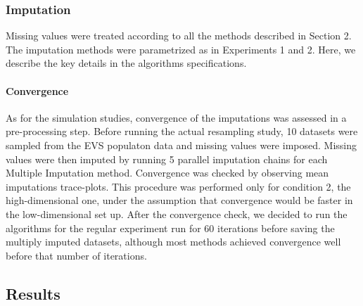 \subsubsection{Imputation}
	
	Missing values were treated according to all the methods described in Section 2.
	The imputation methods were parametrized as in Experiments 1 and 2.
	Here, we describe the key details in the algorithms specifications.

	\paragraph{Convergence}

	As for the simulation studies, convergence of the imputations was assessed in a pre-processing step.
	Before running the actual resampling study, 10 datasets were sampled from the EVS populaton data and missing 
	values were imposed.
	Missing values were then imputed by running 5 parallel imputation chains for each Multiple Imputation 
	method.
	Convergence was checked by observing mean imputations trace-plots.
	This procedure was performed only for condition 2, the high-dimensional one, under the assumption that convergence
	would be faster in the low-dimensional set up.
	After the convergence check, we decided to run the algorithms for the regular experiment run for 60 iterations 
	before saving the multiply imputed datasets, although most methods achieved convergence well before that number 
	of iterations.

\subsection{Results}

